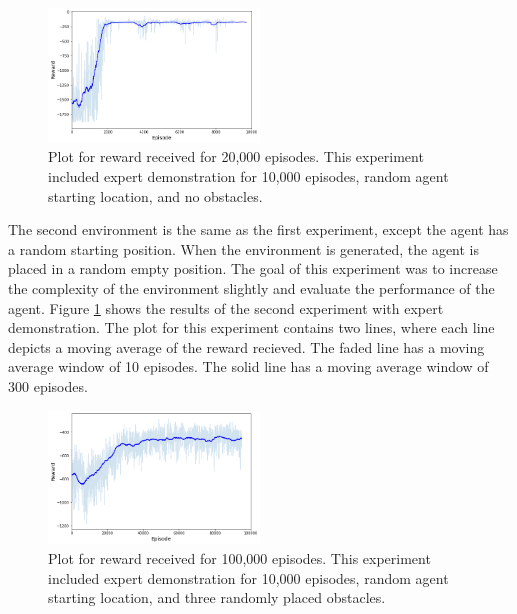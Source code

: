 \documentclass[conference]{IEEEtran}
\begin{document}
\begin{figure}
    \centering
    \includegraphics[width=0.5\textwidth]{assets/randomstartnoobs10kep.png}
    \caption{Plot for reward received for 20,000 episodes. This experiment
        included expert demonstration for 10,000 episodes, random agent starting
        location, and no obstacles.}
    \label{fig:randomstartnoobs10kep}
\end{figure}

The second environment is the same as the first experiment, except the agent has
a random starting position. When the environment is generated, the agent is
placed in a random empty position. The goal of this experiment was to increase
the complexity of the environment slightly and evaluate the performance of the
agent.  Figure \ref{fig:randomstartnoobs10kep} shows the results of the second
experiment with expert demonstration. The plot for this experiment contains two
lines, where each line depicts a moving average of the reward recieved. The
faded line has a moving average window of 10 episodes. The solid line has a
moving average window of 300 episodes.

\begin{figure}
    \centering
    \includegraphics[width=0.5\textwidth]{assets/randomstartrandomobs100kep.png}
    \caption{Plot for reward received for 100,000 episodes. This experiment
        included expert demonstration for 10,000 episodes, random agent starting
        location, and three randomly placed obstacles.}
    \label{fig:randomstartrandomobs100kep}
\end{figure}
\end{document}
